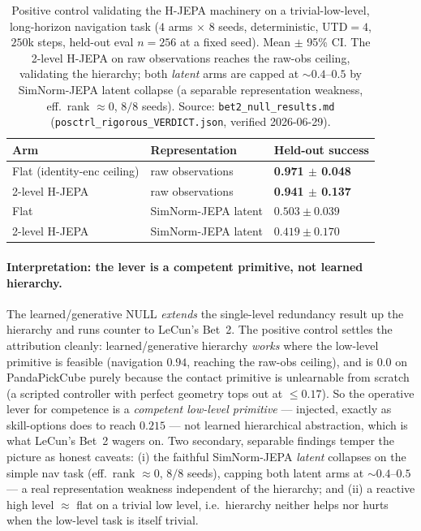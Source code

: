\documentclass{article}
\begin{document}
\begin{table}[t]
\centering
\caption{Positive control validating the H-JEPA machinery on a trivial-low-level,
long-horizon navigation task ($4$ arms $\times$ $8$ seeds, deterministic, UTD$=4$,
$250$k steps, held-out eval $n{=}256$ at a fixed seed). Mean $\pm$ 95\% CI. The
2-level H-JEPA on raw observations reaches the raw-obs ceiling, validating the
hierarchy; both \emph{latent} arms are capped at ${\sim}0.4$--$0.5$ by SimNorm-JEPA
latent collapse (a separable representation weakness, eff.\ rank ${\approx}0$,
$8/8$ seeds). Source: \texttt{bet2\_null\_results.md}
(\texttt{posctrl\_rigorous\_VERDICT.json}, verified 2026-06-29).}
\label{tab:bet2posctrl}
\begin{tabular}{lll}
\toprule
Arm & Representation & Held-out success \\
\midrule
Flat (identity-enc ceiling)    & raw observations     & \textbf{0.971 $\pm$ 0.048} \\
2-level H-JEPA                 & raw observations     & \textbf{0.941 $\pm$ 0.137} \\
Flat                          & SimNorm-JEPA latent  & $0.503 \pm 0.039$ \\
2-level H-JEPA                 & SimNorm-JEPA latent  & $0.419 \pm 0.170$ \\
\bottomrule
\end{tabular}
\end{table}

\paragraph{Interpretation: the lever is a competent primitive, not learned hierarchy.}
The learned/generative NULL \emph{extends} the single-level redundancy result up
the hierarchy and runs counter to LeCun's Bet~2. The positive control settles the
attribution cleanly: learned/generative hierarchy \emph{works} where the low-level
primitive is feasible (navigation $0.94$, reaching the raw-obs ceiling), and is
$0.0$ on PandaPickCube purely because the contact primitive is unlearnable from
scratch (a scripted controller with perfect geometry tops out at ${\leq}0.17$).
So the operative lever for competence is a \emph{competent low-level primitive} ---
injected, exactly as skill-options does to reach $0.215$ --- not learned
hierarchical abstraction, which is what LeCun's Bet~2 wagers on. Two secondary,
separable findings temper the picture as honest caveats: (i) the faithful
SimNorm-JEPA \emph{latent} collapses on the simple nav task (eff.\ rank
${\approx}0$, $8/8$ seeds), capping both latent arms at ${\sim}0.4$--$0.5$ --- a
real representation weakness independent of the hierarchy; and (ii) a reactive
high level $\approx$ flat on a trivial low level, i.e.\ hierarchy neither helps nor
hurts when the low-level task is itself trivial.
\end{document}

